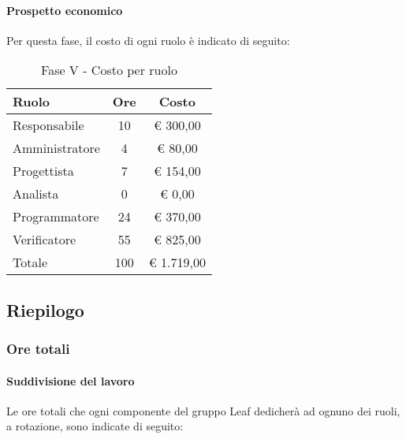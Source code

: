 \documentclass[../PianoProgetto.tex]{subfiles}
\begin{document}
	\paragraph{Prospetto economico}
					Per questa fase, il costo di ogni ruolo è indicato di seguito:
					\begin{table}[h]
		\centering
	
		\begin{tabular}{l * {2}{c}}
			\toprule
			Ruolo & Ore & Costo \\
			\midrule
			Responsabile &	10 & \euro{} 300,00 \\
			\midrule
			Amministratore & 4 & \euro{} 80,00 \\
			\midrule
			Progettista & 7 & \euro{} 154,00 \\
			\midrule
			Analista & 0 & \euro{} 0,00 \\
			\midrule
			Programmatore & 24 & \euro{} 370,00 \\
			\midrule
			Verificatore & 55 & \euro{} 825,00 \\
			\midrule		
			Totale & 100 & \euro{} 1.719,00 \\
			\bottomrule
			
		\end{tabular}
		
		\caption{Fase V - Costo per ruolo}
		\label{tab:faseV_costo}
		
	\end{table}
	
	\subsection{Riepilogo}
			\subsubsection{Ore totali}
				\paragraph{Suddivisione del lavoro}
					Le ore totali che ogni componente del gruppo Leaf dedicherà ad ognuno dei ruoli, a rotazione, sono indicate di seguito:
	
\end{document}
